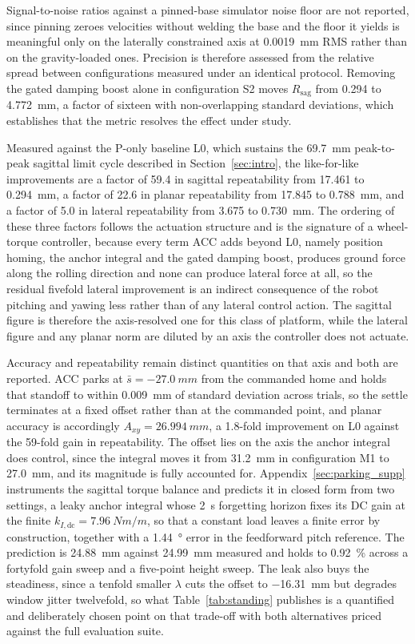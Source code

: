 \documentclass[a4paper,fleqn]{cas-dc}
\begin{document}
Signal-to-noise ratios against a pinned-base simulator noise floor are not
reported, since pinning zeroes velocities without welding the base and the floor
it yields is meaningful only on the laterally constrained axis at
\SI{0.0019}{mm} RMS rather than on the gravity-loaded ones. Precision is
therefore assessed from the relative spread between configurations measured
under an identical protocol. Removing the gated damping boost alone in
configuration S2 moves $R_{\text{sag}}$ from \num{0.294} to \SI{4.772}{mm}, a
factor of sixteen with non-overlapping standard deviations, which establishes
that the metric resolves the effect under study.

Measured against the P-only baseline L0, which sustains the \SI{69.7}{mm}
peak-to-peak sagittal limit cycle described in Section~\ref{sec:intro}, the
like-for-like improvements are a factor of \num{59.4} in sagittal
repeatability from \num{17.461} to \SI{0.294}{mm}, a factor of \num{22.6} in
planar repeatability from \num{17.845} to \SI{0.788}{mm}, and a factor of
\num{5.0} in lateral repeatability from \num{3.675} to \SI{0.730}{mm}.
The ordering of these three factors follows the actuation structure and is the
signature of a wheel-torque controller, because every term ACC adds beyond L0,
namely position homing, the anchor integral and the gated damping boost, produces
ground force along the rolling direction and none can produce lateral force at
all, so the residual fivefold lateral improvement is an indirect consequence of
the robot pitching and yawing less rather than of any lateral control action. The
sagittal figure is therefore the axis-resolved one for this class of platform,
while the lateral figure and any planar norm are diluted by an axis the
controller does not actuate.

Accuracy and repeatability remain distinct quantities on that axis and both are
reported. ACC parks at $\bar{s}={-}\SI{27.0}{mm}$ from the commanded home and
holds that standoff to within \SI{0.009}{mm} of standard deviation across trials,
so the settle terminates at a fixed offset rather than at the commanded point,
and planar accuracy is accordingly $A_{xy}=\SI{26.994}{mm}$, a \num{1.8}-fold
improvement on L0 against the \num{59}-fold gain in repeatability. The offset
lies on the axis the anchor integral does control, since the integral moves it
from \SI{31.2}{mm} in configuration M1 to \SI{27.0}{mm}, and its magnitude is
fully accounted for. Appendix~\ref{sec:parking_supp} instruments the sagittal
torque balance and predicts it in closed form from two settings, a leaky anchor
integral whose \SI{2}{s} forgetting horizon fixes its DC gain at the finite
$k_{I,\text{dc}}{=}\SI{7.96}{Nm/m}$, so that a constant load leaves a finite
error by construction, together with a \SI{1.44}{\degree} error in the
feedforward pitch reference. The prediction is \SI{24.88}{mm} against
\SI{24.99}{mm} measured and holds to \SI{0.92}{\percent} across a fortyfold gain
sweep and a five-point height sweep. The leak also buys the steadiness, since a
tenfold smaller $\lambda$ cuts the offset to \SI{-16.31}{mm} but degrades window
jitter twelvefold, so what Table~\ref{tab:standing} publishes is a quantified and
deliberately chosen point on that trade-off with both alternatives priced against
the full evaluation suite.
\end{document}
